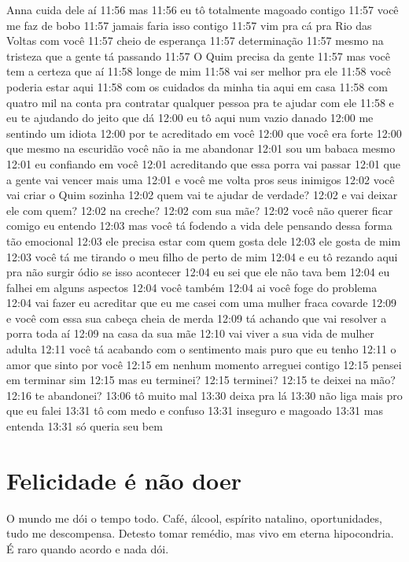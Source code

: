{{Anna cuida dele
aí 11:56 mas 11:56 eu tô totalmente magoado contigo 11:57 você me faz de
bobo 11:57 jamais faria isso contigo 11:57 vim pra cá pra Rio das Voltas
com você 11:57 cheio de esperança 11:57 determinação 11:57 mesmo na
tristeza que a gente tá passando 11:57 O Quim precisa da gente 11:57
mas você tem a certeza que aí 11:58 longe de mim 11:58 vai ser melhor
pra ele 11:58 você poderia estar aqui 11:58 com os cuidados da minha tia
aqui em casa 11:58 com quatro mil na conta pra contratar qualquer pessoa
pra te ajudar com ele 11:58 e eu te ajudando do jeito que dá 12:00 eu tô
aqui num vazio danado 12:00 me sentindo um idiota 12:00 por te
acreditado em você 12:00 que você era forte 12:00 que mesmo na escuridão
você não ia me abandonar 12:01 sou um babaca mesmo 12:01 eu confiando em
você 12:01 acreditando que essa porra vai passar 12:01 que a gente vai
vencer mais uma 12:01 e você me volta pros seus inimigos 12:02 você vai
criar o Quim sozinha 12:02 quem vai te ajudar de verdade? 12:02 e vai
deixar ele com quem? 12:02 na creche? 12:02 com sua mãe? 12:02 você não
querer ficar comigo eu entendo 12:03 mas você tá fodendo a vida dele
pensando dessa forma tão emocional 12:03 ele precisa estar com quem
gosta dele 12:03 ele gosta de mim 12:03 você tá me tirando o meu filho
de perto de mim 12:04 e eu tô rezando aqui pra não surgir ódio se isso
acontecer 12:04 eu sei que ele não tava bem 12:04 eu falhei em alguns
aspectos 12:04 você também 12:04 ai você foge do problema 12:04 vai
fazer eu acreditar que eu me casei com uma mulher fraca covarde 12:09 e
você com essa sua cabeça cheia de merda 12:09 tá achando que vai
resolver a porra toda aí 12:09 na casa da sua mãe 12:10 vai viver a sua
vida de mulher adulta 12:11 você tá acabando com o sentimento mais puro
que eu tenho 12:11 o amor que sinto por você 12:15 em nenhum momento
arreguei contigo 12:15 pensei em terminar sim 12:15 mas eu terminei?
12:15 terminei? 12:15 te deixei na mão? 12:16 te abandonei? 13:06 tô
muito mal 13:30 deixa pra lá 13:30 não liga mais pro que eu falei 13:31
tô com medo e confuso 13:31 inseguro e magoado 13:31 mas entenda 13:31
só queria seu bem

\chapter{Felicidade é não doer}\label{felicidade-uxe9-nuxe3o-doer}

O mundo me dói o tempo todo. Café, álcool, espírito natalino,
oportunidades, tudo me descompensa. Detesto tomar remédio, mas vivo em
eterna hipocondria. É raro quando acordo e nada dói.

}}
